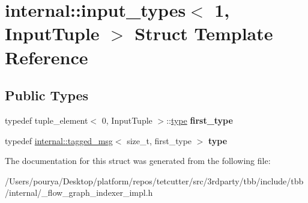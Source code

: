 \hypertarget{structinternal_1_1input__types_3_011_00_01InputTuple_01_4}{}\section{internal\+:\+:input\+\_\+types$<$ 1, Input\+Tuple $>$ Struct Template Reference}
\label{structinternal_1_1input__types_3_011_00_01InputTuple_01_4}
\subsection*{Public Types}
\begin{DoxyCompactItemize}
\item 
\hypertarget{structinternal_1_1input__types_3_011_00_01InputTuple_01_4_a38fa397500201b2c72559a87da2ad53a}{}typedef tuple\+\_\+element$<$ 0, Input\+Tuple $>$\+::\hyperlink{classinternal_1_1tagged__msg}{type} {\bfseries first\+\_\+type}\label{structinternal_1_1input__types_3_011_00_01InputTuple_01_4_a38fa397500201b2c72559a87da2ad53a}

\item 
\hypertarget{structinternal_1_1input__types_3_011_00_01InputTuple_01_4_a83008853396fe1c8d57fe21d4519fcd1}{}typedef \hyperlink{classinternal_1_1tagged__msg}{internal\+::tagged\+\_\+msg}$<$ size\+\_\+t, first\+\_\+type $>$ {\bfseries type}\label{structinternal_1_1input__types_3_011_00_01InputTuple_01_4_a83008853396fe1c8d57fe21d4519fcd1}

\end{DoxyCompactItemize}


The documentation for this struct was generated from the following file\+:\begin{DoxyCompactItemize}
\item 
/\+Users/pourya/\+Desktop/platform/repos/tetcutter/src/3rdparty/tbb/include/tbb/internal/\+\_\+flow\+\_\+graph\+\_\+indexer\+\_\+impl.\+h\end{DoxyCompactItemize}
